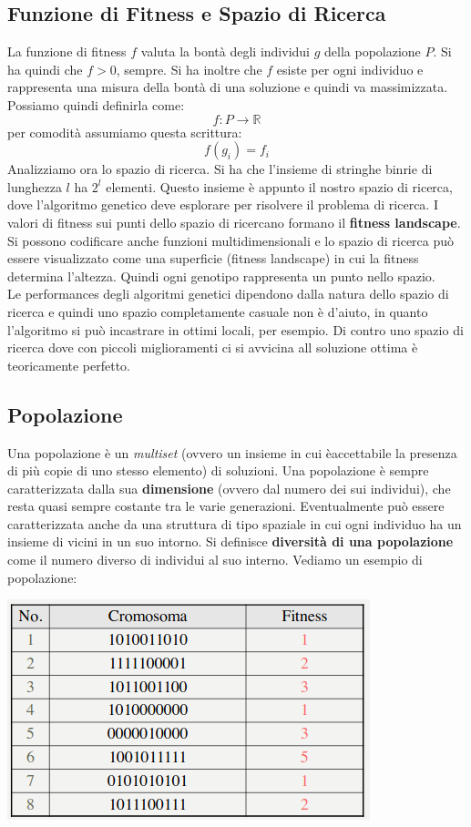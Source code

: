 \documentclass[a4paper,12pt, oneside]{book}
\begin{document}
\subsection{Funzione di Fitness e Spazio di Ricerca}
La funzione di fitness $f$ valuta la bontà degli individui $g$ della
popolazione $P$. Si ha quindi che $f>0$, sempre. Si ha inoltre che
$f$ esiste per ogni individuo e rappresenta una misura della bontà di
una soluzione e quindi va massimizzata. Possiamo quindi definirla
come: 
\[f:P\to\mathbb{R}\]
per comodità assumiamo questa scrittura:
\[f(g_i)=f_i\]
Analizziamo ora lo spazio di ricerca. Si ha che l'insieme di stringhe
binrie di lunghezza $l$ ha $2^l$ elementi. Questo insieme è appunto il
nostro spazio di ricerca, dove l'algoritmo genetico deve esplorare per
risolvere il problema di ricerca. I valori di fitness sui punti dello
spazio di ricercano formano il \textbf{fitness landscape}.\\
Si possono codificare anche funzioni multidimensionali e lo spazio di
ricerca può essere visualizzato come una superficie (fitness
landscape) in cui la fitness determina l’altezza. Quindi ogni genotipo
rappresenta un punto nello spazio. \\
Le performances degli algoritmi genetici dipendono dalla natura dello
spazio di ricerca e quindi uno spazio completamente casuale non è
d'aiuto, in quanto l'algoritmo si può incastrare in ottimi locali, per
esempio. Di contro uno spazio di ricerca dove con piccoli
miglioramenti ci si avvicina all soluzione ottima è teoricamente
perfetto.
\subsection{Popolazione}
Una popolazione è un \textit{multiset} (ovvero un insieme in cui
èaccettabile la presenza di più copie di uno stesso elemento) di
soluzioni. Una popolazione è sempre caratterizzata dalla sua
\textbf{dimensione} (ovvero dal numero dei sui individui), che resta quasi
sempre costante tra le varie generazioni. Eventualmente può
essere caratterizzata anche da una struttura di tipo spaziale in cui
ogni individuo ha un insieme di vicini in un suo intorno. Si definisce
\textbf{diversità di una popolazione} come il numero diverso di
individui al suo interno.
\newpage
Vediamo un esempio di popolazione:
\begin{center}
  \includegraphics[scale = 0.7]{img/bio3.png}
\end{center}
\end{document}
